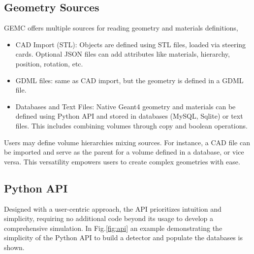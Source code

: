 \subsection{Geometry Sources}
\label{subsec:databases}
GEMC offers multiple sources for reading geometry and materials definitions,

\begin{itemize}
    \item CAD Import (STL): Objects are defined using STL files, loaded via
    steering cards.
    Optional JSON files can add attributes like materials,
    hierarchy, position, rotation, etc.
    \item GDML files: same as CAD import, but the geometry is defined
    in a GDML file.
    \item Databases and Text Files: Native Geant4 geometry and materials can be defined
    using Python API and stored in databases (MySQL, Sqlite) or text files.
    This includes combining volumes through copy and boolean operations.
\end{itemize}
Users may define volume hierarchies mixing sources.
For instance, a CAD file can be imported and serve as the parent for a volume
defined in a database, or vice versa.
This versatility empowers users to create complex geometries with ease.

\subsection{Python API}
\label{subsec:api}
Designed with a user-centric approach, the API prioritizes intuition and simplicity,
requiring no additional code beyond its usage to develop a comprehensive simulation.
In Fig.\ref{fig:api} an example demonstrating the simplicity of the Python API to build
a detector and populate the databases is shown.

